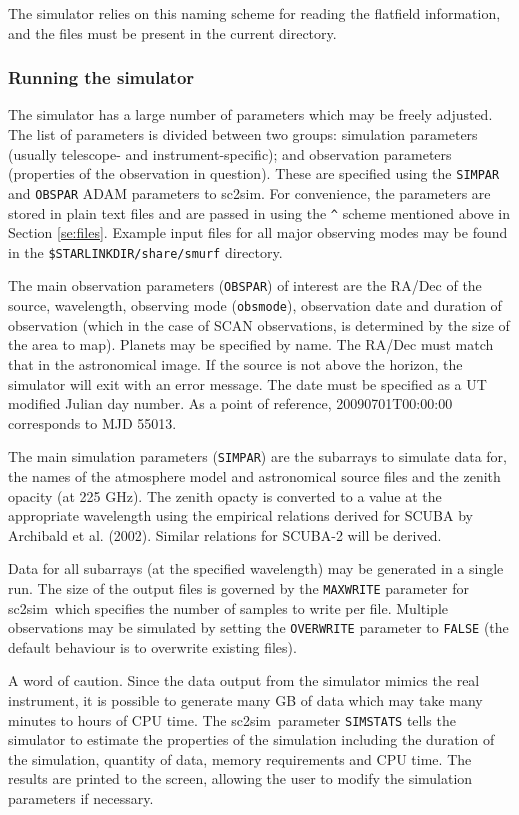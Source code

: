 \documentclass[twoside,11pt]{article}
\newcommand{\xref}[3]{#1}
\renewcommand{\_}{\texttt{\symbol{95}}}
\newcommand{\task}[1]{\textsf{#1}}
\newcommand{\sctwosim}{\xref{\task{sc2sim}}{sun258}{SC2SIM}}
\begin{document}
The simulator relies on this naming scheme for reading the flatfield
information, and the files must be present in the current directory.

\subsubsection{Running the simulator}

The simulator has a large number of parameters which may be freely
adjusted. The list of parameters is divided between two groups:
simulation parameters (usually telescope- and instrument-specific); and
observation parameters (properties of the observation in
question). These are specified using the \texttt{SIMPAR} and
\texttt{OBSPAR} ADAM parameters to \sctwosim. For convenience, the
parameters are stored in plain text files and are passed in using the
\verb+^+ scheme mentioned above in Section \ref{se:files}. Example
input files for all major observing modes may be found in the
\texttt{\$STARLINK\_DIR/share/smurf} directory.

The main observation parameters (\texttt{OBSPAR}) of interest are the
RA/Dec of the source, wavelength, observing mode (\texttt{obsmode}),
observation date and duration of observation (which in the case of
SCAN observations, is determined by the size of the area to
map). Planets may be specified by name. The RA/Dec must match that in
the astronomical image. If the source is not above the horizon, the
simulator will exit with an error message. The date must be specified
as a UT modified Julian day number. As a point of reference,
20090701T00:00:00 corresponds to MJD 55013.

The main simulation parameters (\texttt{SIMPAR}) are the subarrays to
simulate data for, the names of the atmosphere model and astronomical
source files and the zenith opacity (at 225 GHz). The zenith opacty is
converted to a value at the appropriate wavelength using the empirical
relations derived for SCUBA by Archibald et al. (2002). Similar
relations for SCUBA-2 will be derived.

Data for all subarrays (at the specified wavelength) may be generated
in a single run. The size of the output files is governed by the
\texttt{MAXWRITE} parameter for \sctwosim\ which specifies the number
of samples to write per file. Multiple observations may be simulated
by setting the \texttt{OVERWRITE} parameter to \texttt{FALSE} (the
default behaviour is to overwrite existing files).

A word of caution. Since the data output from the simulator mimics the
real instrument, it is possible to generate many GB of data which may
take many minutes to hours of CPU time. The \sctwosim\ parameter
\texttt{SIMSTATS} tells the simulator to estimate the properties of
the simulation including the duration of the simulation, quantity of
data, memory requirements and CPU time. The results are printed to the
screen, allowing the user to modify the simulation parameters if
necessary.
\end{document}
